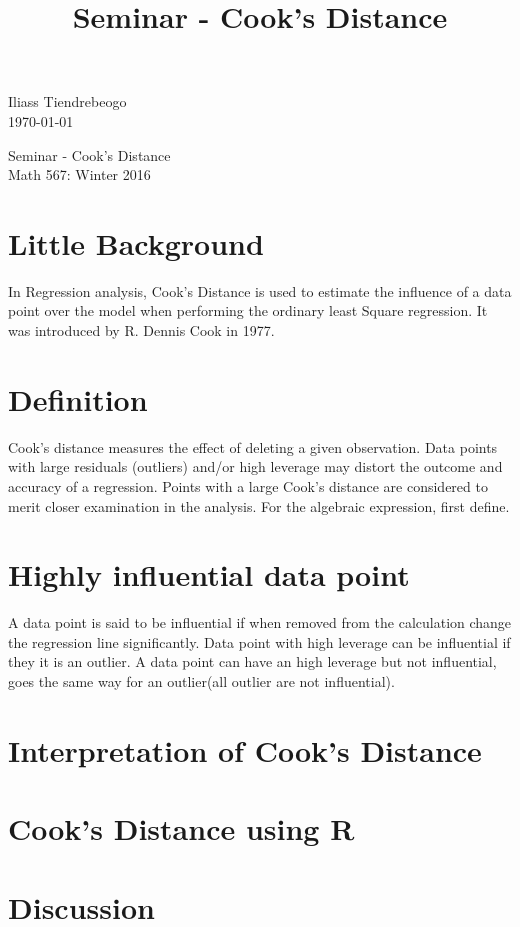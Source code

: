\documentclass{article}[16pt]
\begin{document}
\begin{center}


\title{Seminar - Cook's Distance }
\hfill Iliass Tiendrebeogo\\

\hfill \today\\
\end{center}
\bigskip

\begin{center}
  \begin{Large}
      
    Seminar - Cook's Distance \\
    Math 567: Winter 2016 \\
       
  \end{Large}
\end{center}

\bigskip
\section{Little Background}
In Regression analysis, Cook's Distance is used to estimate the influence of a data point over the model when performing the ordinary least Square regression. It was introduced by R. Dennis Cook in 1977. \citep{cook} 
\section{Definition}
Cook's distance measures the effect of deleting a given observation. Data points with large residuals (outliers) and/or high leverage may distort the outcome and accuracy of a regression. Points with a large Cook's distance are considered to merit closer examination in the analysis. For the algebraic expression, first define.
\section{Highly influential  data point}
A data point is said to be influential if when removed from the calculation change the regression line significantly. Data point with high leverage can be influential if they it is an outlier. A data point can have an high leverage but not influential, goes the same way for an outlier(all outlier are not influential).
\section{Interpretation of Cook's Distance}
\section{Cook's Distance using R}
\section{Discussion}




\end{document}
